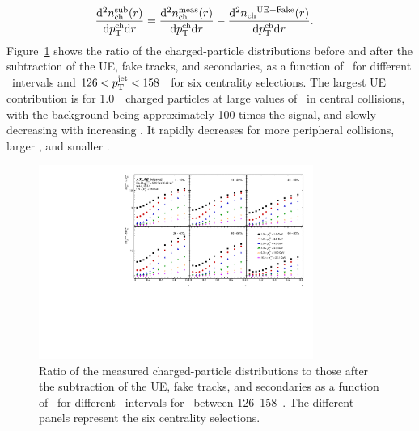 \begin{align*}
\frac{\mathrm{d}^2 \mbox{$n_{\mathrm{ch}}^{\mathrm{sub}}$} (r) }{ \mathrm{d} \mbox{$p_{\mathrm{T}}^{\mathrm{ch}}$} \mathrm{d} r } &=  \frac{\mathrm{d}^2 \mbox{$n_{\mathrm{ch}}^{\mathrm{meas}}$}  (r) }{ \mathrm{d} \mbox{$p_{\mathrm{T}}^{\mathrm{ch}}$} \mathrm{d} r} -  \frac{ \mathrm{d}^2 \mbox{$n_{\mathrm{ch}}$}^{\mathrm{UE+Fake}}(r)  }{ \mathrm{d} \mbox{$p_{\mathrm{T}}^{\mathrm{ch}}$} \mathrm{d} r}.
\end{align*}
Figure~\ref{fig:UEsize} shows the ratio of the charged-particle distributions before and after the subtraction of the UE, fake tracks, and secondaries, as a function of \rvar\ for different \pttrk\ intervals and $126 < \mbox{$p_{\mathrm{T}}^{\mathrm{jet}}$} < 158$ \GeV\ for six centrality selections.
The largest UE contribution is for 1.0~\GeV\ charged particles at large values of \rvar\ in central collisions, with the background being approximately 100 times the signal, and slowly decreasing with increasing \ptjet.
It rapidly decreases for more peripheral collisions, larger \pttrk, and smaller \rvar.

\begin{figure}
\centerline{
 \includegraphics[width=0.8\textwidth]{figures/performance/UE_B2S_single_0} }
\caption{Ratio of the measured charged-particle distributions to those after the subtraction of the UE, fake tracks, and secondaries as a function of \rvar\ for different \pttrk\ intervals for \ptjet\ between 126--158~\GeV.
The different panels represent the six centrality selections.}
\label{fig:UEsize}
\end{figure}

